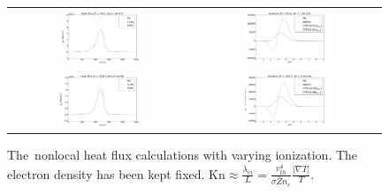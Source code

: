 \documentclass[preprint,12pt]{elsarticle}
\newcommand{\mfpei}{\lambda_{ei}}
\newcommand{\Zbar}{\bar{Z}}
\newcommand{\vth}{v_{th}}
\newcounter{bla}
\begin{document}
\begin{figure}[tbh]
\begin{center}
\begin{tabular}{cc}
      \includegraphics[width=0.5\textwidth]{../results/fe_analysis/figs/P5_heatfluxes_Z50_Kn1e-3.png} &
      \includegraphics[width=0.5\textwidth]{../results/fe_analysis/figs/P5_kinetics_Z50_Kn1e-3.png} \\
      \includegraphics[width=0.5\textwidth]{../results/fe_analysis/figs/P5_heatfluxes_Z100_Kn5e-4.png} &
      \includegraphics[width=0.5\textwidth]{../results/fe_analysis/figs/P5_kinetics_Z100_Kn5e-4.png}
    \end{tabular}
  \caption{
  The~nonlocal heat flux calculations with varying ionization. 
  The electron density has been kept fixed. 
  Kn$\approx \frac{\mfpei}{L} = \frac{\vth^4}{\sigma \Zbar n_e} 
  \frac{|\nabla T|}{T}.$
  }
  \end{center}
  \label{fig:AWBSvsSH_f1}
\end{figure}
\end{document}
